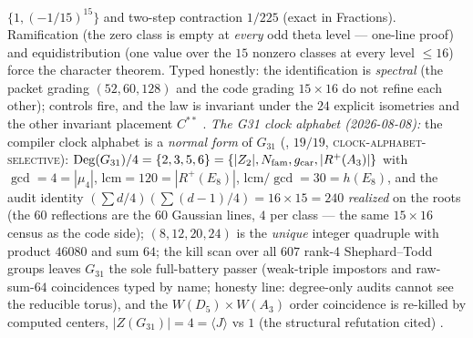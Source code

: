 $\{1, (-1/15)^{15}\}$ and two-step contraction $1/225$ (exact
in Fractions).  Ramification (the zero class is empty at
\emph{every} odd theta level --- one-line proof) and
equidistribution (one value over the $15$ nonzero classes at
every level $\le 16$) force the character theorem.  Typed
honestly: the identification is \emph{spectral} (the packet
grading $(52, 60, 128)$ and the code grading $15 \times 16$ do
not refine each other); controls fire, and the law is invariant
under the $24$ explicit isometries and the other invariant
placement $C^{**}$ \mE.
\emph{The G31 clock alphabet (2026-08-08):} the compiler clock
alphabet is a \emph{normal form} of $G_{31}$
(, $19/19$,
\textsc{clock-alphabet-selective}):
$\mathrm{Deg}(G_{31})/4 = \{2, 3, 5, 6\} = \{|Z_2|,
N_{\mathrm{fam}}, g_{\mathrm{car}}, |R^{+}(A_3)|\}$ with $\gcd = 4 = |\mu_4|$,
$\mathrm{lcm} = 120 = |R^{+}(E_8)|$, $\mathrm{lcm}/\gcd = 30 =
h(E_8)$, and the audit identity $(\sum d/4)(\sum(d{-}1)/4) = 16
\times 15 = 240$ \emph{realized} on the roots (the $60$
reflections are the $60$ Gaussian lines, $4$ per class --- the
same $15 \times 16$ census as the code side); $(8, 12, 20, 24)$
is the \emph{unique} integer quadruple with product $46080$ and
sum $64$; the kill scan over all $607$ rank-4 Shephard--Todd
groups leaves $G_{31}$ the sole full-battery passer (weak-triple
impostors and raw-sum-$64$ coincidences typed by name; honesty
line: degree-only audits cannot see the reducible torus), and
the $W(D_5) \times W(A_3)$ order coincidence is re-killed by
computed centers, $|Z(G_{31})| = 4 = \langle J\rangle$ vs $1$
(the structural refutation cited) \mE.

